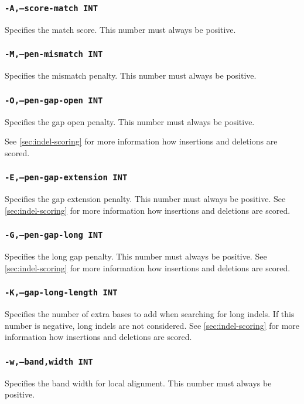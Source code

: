 \documentclass[a4paper,12pt]{book}
\newcommand{\TT}[1]{{\tt #1}} %
\begin{document}
\subsubsection{\TT{-A,--score-match INT}}
Specifies the match score.
This number must always be positive.

\subsubsection{\TT{-M,--pen-mismatch INT}}
Specifies the mismatch penalty.
This number must always be positive.

\subsubsection{\TT{-O,--pen-gap-open INT}}
Specifies the gap open penalty.
This number must always be positive.

See \autoref{sec:indel-scoring} for more information how insertions and deletions are scored.
\subsubsection{\TT{-E,--pen-gap-extension INT}}
Specifies the gap extension penalty.
This number must always be positive.
See \autoref{sec:indel-scoring} for more information how insertions and deletions are scored.

\subsubsection{\TT{-G,--pen-gap-long INT}}
Specifies the long gap penalty.
This number must always be positive.
See \autoref{sec:indel-scoring} for more information how insertions and deletions are scored.

\subsubsection{\TT{-K,--gap-long-length INT}}
Specifies the number of extra bases to add when searching for long indels.
If this number is negative, long indels are not considered.
See \autoref{sec:indel-scoring} for more information how insertions and deletions are scored.

\subsubsection{\TT{-w,--band,width INT}}
Specifies the band width for local alignment.
This number must always be positive.
\end{document}
